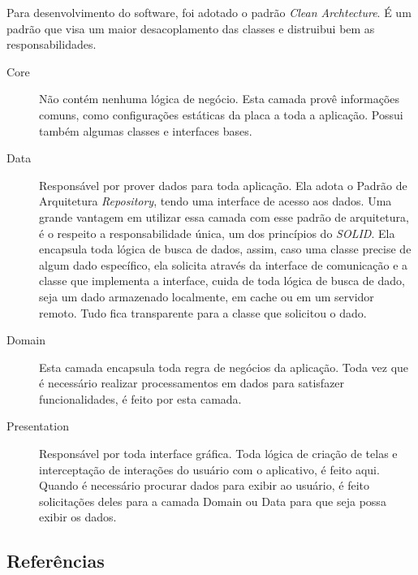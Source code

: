 \documentclass[
	12pt,				%
	oneside,			%
	a4paper,			%
	brazil				%
]{abntex2}
\begin{document}
Para desenvolvimento do software, foi adotado o padrão \textit{Clean Archtecture}. É um padrão que visa um maior desacoplamento das classes e distruibui bem as responsabilidades.

\begin{description}

\item[Core] Não contém nenhuma lógica de negócio. Esta camada provê informações comuns, como configurações estáticas da placa a toda a aplicação. Possui também algumas classes e interfaces bases.

\item[Data] Responsável por prover dados para toda aplicação. Ela adota o Padrão de Arquitetura \textit{Repository}, tendo uma interface de acesso aos dados. Uma grande vantagem em utilizar essa camada com esse padrão de arquitetura, é o respeito a responsabilidade única, um dos princípios do \textit{SOLID}. Ela encapsula toda lógica de busca de dados, assim, caso uma classe precise de algum dado específico, ela solicita através da interface de comunicação e a classe que implementa a interface, cuida de toda lógica de busca de dado, seja um dado armazenado localmente, em cache ou em um servidor remoto. Tudo fica transparente para a classe que solicitou o dado.

\item[Domain] Esta camada encapsula toda regra de negócios da aplicação. Toda vez que é necessário realizar processamentos em dados para satisfazer funcionalidades, é feito por esta camada.

\item[Presentation] Responsável por toda interface gráfica. Toda lógica de criação de telas e interceptação de interações do usuário com o aplicativo, é feito aqui. Quando é necessário procurar dados para exibir ao usuário, é feito solicitações deles para a camada Domain ou Data para que seja possa exibir os dados.
 
\end{description}

\subsection{Referências}
\end{document}
